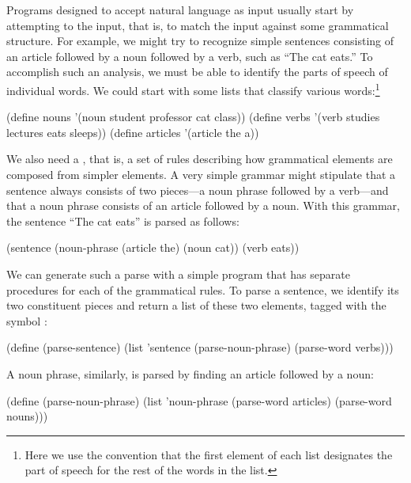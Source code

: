 Programs designed to accept natural language as input usually start by
attempting to  the input, that is, to match the input against
some grammatical structure.  For example, we might try to recognize simple
sentences consisting of an article followed by a noun followed by a verb, such
as ``The cat eats.''  To accomplish such an analysis, we must be able to
identify the parts of speech of individual words.  We could start with some
lists that classify various words:\footnote{Here we use the convention that the
first element of each list designates the part of speech for the rest of the
words in the list.}

\begin{codeBlock}
(define nouns '(noun student professor cat class))
(define verbs '(verb studies lectures eats sleeps))
(define articles '(article the a))
\end{codeBlock}

\noindent
We also need a , that is, a set of rules describing how
grammatical elements are composed from simpler elements.  A very simple grammar
might stipulate that a sentence always consists of two pieces---a noun phrase
followed by a verb---and that a noun phrase consists of an article followed by
a noun.  With this grammar, the sentence ``The cat eats'' is parsed as follows:

\begin{codeBlock}
(sentence (noun-phrase (article the) (noun cat))
          (verb eats))
\end{codeBlock}

\noindent
We can generate such a parse with a simple program that has separate procedures
for each of the grammatical rules.  To parse a sentence, we identify its two
constituent pieces and return a list of these two elements, tagged with the
symbol :

\begin{codeBlock}
(define (parse-sentence)
  (list 'sentence
         (parse-noun-phrase)
         (parse-word verbs)))
\end{codeBlock}

\noindent
A noun phrase, similarly, is parsed by finding an article followed by a
noun:

\begin{codeBlock}
(define (parse-noun-phrase)
  (list 'noun-phrase
        (parse-word articles)
        (parse-word nouns)))
\end{codeBlock}

